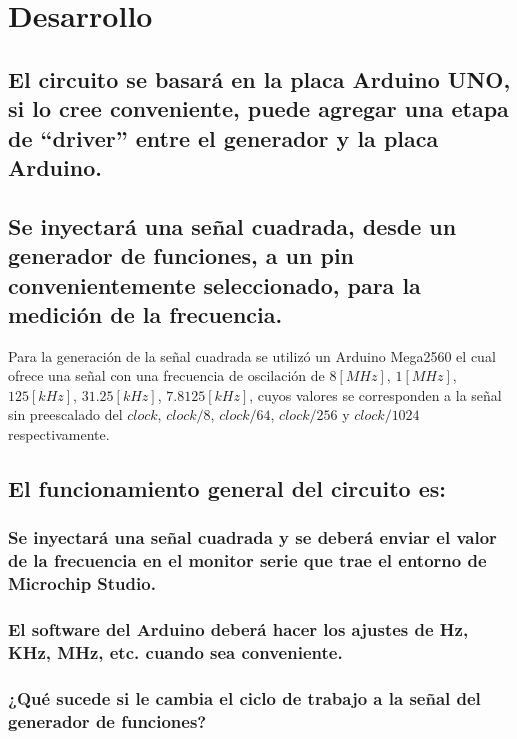 \documentclass[a4paper, 12pt]{article}
\begin{document}
\newpage
{}

\section{Desarrollo}

\subsection{El circuito se basará en la placa Arduino UNO, si lo cree conveniente, puede agregar una etapa de “driver” entre el generador y la placa Arduino.}

\subsection{Se inyectará una señal cuadrada, desde un generador de funciones, a un pin convenientemente seleccionado, para la medición de la frecuencia.}

Para la generación de la señal cuadrada se utilizó un Arduino Mega2560 el cual ofrece una señal con una frecuencia de oscilación de $8[MHz]$, $1[MHz]$, $125[kHz]$, $31.25[kHz]$, $7.8125[kHz]$, cuyos valores se corresponden a la señal sin preescalado del $clock$, $clock/8$, $clock/64$, $clock/256$ y $clock/1024$ respectivamente.

\subsection{El funcionamiento general del circuito es:}

\subsubsection{Se inyectará una señal cuadrada y se deberá enviar el valor de la frecuencia en el monitor serie que trae el entorno de Microchip Studio.}

\subsubsection{El software del Arduino deberá hacer los ajustes de Hz, KHz, MHz, etc. cuando sea conveniente.}

\subsubsection{¿Qué sucede si le cambia el ciclo de trabajo a la señal del generador de funciones?}
\end{document}
